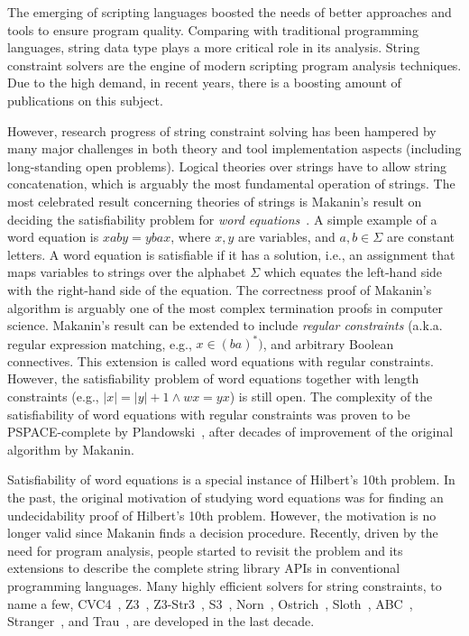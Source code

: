 
The emerging of scripting languages boosted the needs of better approaches and tools to ensure program quality.
Comparing with traditional programming languages, string data type plays a more critical role in its analysis.
String constraint solvers are the engine of modern scripting program analysis techniques. 
Due to the high demand, in recent years, there is a boosting amount of publications on this subject.

However, research progress of string constraint solving has been hampered by many major challenges in both theory and tool implementation aspects (including long-standing open problems). 
Logical theories over strings have to allow string concatenation, which is arguably the most fundamental operation of strings. 
The most celebrated result concerning theories of strings is Makanin’s result on deciding the satisfiability problem for \emph{word equations}~\cite{makanin77}.
A simple example of a word equation is $xaby = ybax$, where $x, y$ are variables, and $a, b \in \Sigma$ are constant letters. 
A word equation is satisfiable if it has a solution, i.e., an assignment that maps variables to strings over the alphabet $\Sigma$ which equates the left-hand side with the right-hand side of the equation.
The correctness proof of Makanin’s algorithm is arguably one of the most complex termination proofs in computer science. 
Makanin’s result can be extended to include \emph{regular constraints} (a.k.a. regular expression matching, e.g., $x \in (ba)^*)$, and arbitrary Boolean connectives.
This extension is called word equations with regular constraints. 
However, the satisfiability problem of word equations together with length constraints (e.g., $|x|=|y|+1 \wedge wx=yx$) is still open.
The complexity of the satisfiability of word equations with regular constraints was proven to be PSPACE-complete by Plandowski~\cite{plandowski99}, after decades of improvement of the original algorithm by Makanin.

Satisfiability of word equations is a special instance of Hilbert’s 10th problem. 
In the past, the original motivation of studying word equations was for finding an undecidability proof of Hilbert’s 10th problem. 
However, the motivation is no longer valid since Makanin finds a decision procedure. Recently, driven by the need for program analysis, people started to revisit the problem and its extensions to describe the complete string library APIs in conventional programming languages. Many highly efficient solvers for string constraints, to name a few, CVC4~\cite{cvc4Tool}, Z3~\cite{z3}, Z3-Str3~\cite{zheng2013z3}, S3~\cite{trinh2014s3}, Norn~\cite{abdulla2015norn}, Ostrich~\cite{chen2017decidable}, Sloth~\cite{sloth}, ABC~\cite{aydin2018parameterized}, Stranger~\cite{yu2010stranger}, and Trau~\cite{abdulla2018trau}, are developed in the last decade.

